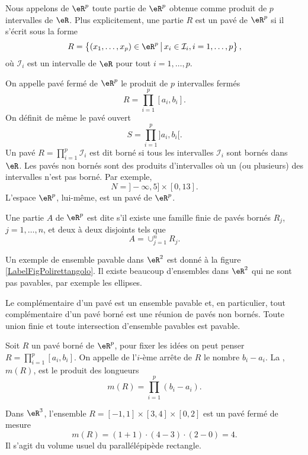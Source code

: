 \begin{definition}
 Nous appelons  de $\eR^p$ toute partie de $\eR^p$ obtenue comme produit de $p$ intervalles de $\eR$. Plus explicitement, une partie $R$ est un pavé de $\eR^p$ si il s'écrit sous la forme
\[
R=\left\{(x_1,\ldots, x_p)\in\eR^p \,\big\vert\,x_i\in \mathcal{I}_i,  i=1,\ldots, p  \right\},
\]
où $\mathcal{I}_i$ est un intervalle de $\eR$ pour tout $i=1,\ldots, p$. 
\end{definition}
On appelle pavé fermé de $\eR^p$ le produit de $p$ intervalles fermés 
\[
R=\prod_{i=1}^{p}[a_i,b_i].
\]
On définit de même le pavé ouvert 
\[
S=\prod_{i=1}^{p}]a_i,b_i[.
\]
Un pavé $ R=\prod_{i=1}^{p}\mathcal{I}_i$ est dit borné si tous les intervalles $\mathcal{I}_i$ sont bornés dans $\eR$. Les pavés non bornés sont des produits d'intervalles où un (ou plusieurs) des intervalles n'est pas borné. Par exemple,
\[
N=]-\infty, 5]\times [0,13].
\]
L'espace $\eR^p$, lui-même, est un pavé de $\eR^p$. 
\begin{definition}
  Une partie $A$ de $\eR^p$ est dite   s'il existe une famille finie de pavés bornés $R_j$, $j=1,\ldots, n$, et deux à deux disjoints tels que 
\[
A=\cup_{j=1}^{n}R_j.
\] 
\end{definition}
Un exemple de ensemble pavable dans $\eR^2$ est donné à la figure \ref{LabelFigPolirettangolo}. Il existe beaucoup d'ensembles dans $\eR^2$ qui ne sont pas pavables, par exemple les ellipses.
\newcommand{\CaptionFigPolirettangolo}{Un ensemble pavable.}


Le complémentaire d'un pavé est  un ensemble pavable et, en particulier, tout complémentaire d'un pavé borné est une réunion de  pavés non bornés. Toute union finie et toute intersection d'ensemble pavables est pavable.    
\begin{definition}
	Soit $R$ un pavé borné de $\eR^p$, pour fixer les idées on peut penser $R=\prod_{i=1}^{p}[a_i,b_i]$. On appelle  de l'$i$-ème arrête de $R$ le nombre $b_i-a_i$. La , $m(R)$, est le produit des longueurs 
\[
m(R)=\prod_{i=1}^{p}(b_i-a_i).
\] 
\end{definition}
\begin{example}
  Dans $\eR^3$, l'ensemble $R=[-1,1]\times[3,4]\times[0,2]$ est un pavé fermé de mesure 
\[
m(R)= (1+1)\cdot(4-3)\cdot(2-0)=4.
\] 
Il s'agit du volume usuel du parallélépipède rectangle.
\end{example}

